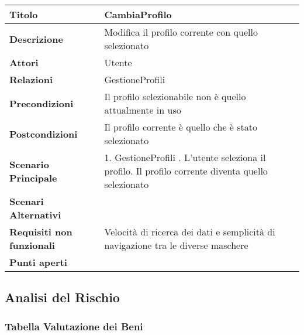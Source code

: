 \begin{tabular} {|P{4.5cm}|P{12.5cm}|}
  \hline
  \textbf{Titolo}                   & CambiaProfilo                                            \\
  \hline
  \textbf{Descrizione}              & Modifica il profilo corrente con quello selezionato      \\
  \hline
  \textbf{Attori}                   & Utente                                                   \\
  \hline
  \textbf{Relazioni}                & GestioneProfili                                          \\
  \hline
  \textbf{Precondizioni}            & Il profilo selezionabile non è quello attualmente in uso \\
  \hline
  \textbf{Postcondizioni}           & Il profilo corrente è quello che è stato selezionato     \\
  \hline
  \textbf{Scenario Principale}      & 1. GestioneProfili . L'utente seleziona il profilo. Il profilo corrente diventa quello selezionato                                            \\
  \hline
  \textbf{Scenari Alternativi}      &                                                          \\
  \hline
  \textbf{Requisiti non funzionali} & Velocità di ricerca dei dati e
  semplicità di navigazione tra le diverse maschere                                            \\
  \hline
  \textbf{Punti aperti}             &                                                          \\
  \hline
\end{tabular}
\hfill
\break

\subsection{Analisi del Rischio}

\subsubsection{Tabella Valutazione dei Beni}

